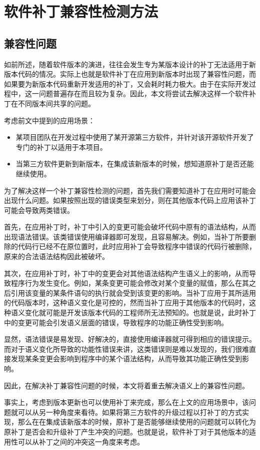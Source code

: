 \chapter{软件补丁兼容性检测方法}
\section{兼容性问题}
\label {sec_problem}
如前所述，随着软件版本的演进，往往会发生专为某版本设计的补丁无法适用于新版本代码的情况。实际上也就是软件补丁在应用到新版本时出现了兼容性问题，而如果要为新版本代码重新开发适用的补丁，又会耗时耗力极大。由于在实际开发过程中，这一问题普遍存在而且较为复杂。因此，本文将尝试去解决这样一个软件补丁在不同版本间共享的问题。

考虑前文中提到的应用场景：
\begin{itemize}
	\item 某项目团队在开发过程中使用了某开源第三方软件，并针对该开源软件开发了专门的补丁以适用于本项目。
	\item 当第三方软件更新到新版本，在集成该新版本的时候，想知道原补丁是否还能继续使用。
\end{itemize}

为了解决这样一个补丁兼容性检测的问题，首先我们需要知道补丁在应用时可能会出现什么问题。如果按照出现的错误类型来划分，则在其他版本代码上应用该补丁可能会导致两类错误。

首先，在应用补丁时，补丁中引入的变更可能会破坏代码中原有的语法结构，从而出现语法错误。该类错误使用编译器即可发现，且容易解决。例如，当补丁所要删除的代码行已经不在原位置时，此时应用补丁会导致程序中错误的代码行被删除，原来的合法语法结构因此被破坏。

其次，在应用补丁时，补丁中的变更会对其他语法结构产生语义上的影响，从而导致程序行为发生变化。例如，某条变更可能会修改对某个变量的赋值，那么在其之后引用该变量的某条件语句的执行就会受到该变更的影响。当补丁应用于其所适用的代码版本时，这种语义变化是可控的，然而当补丁应用于其他版本的代码时，这种语义变化就可能是开发该版本代码的工程师所无法预知的。也就是说，此时补丁中的变更可能会引发语义层面的错误，导致程序的功能正确性受到影响。

显然，语法错误是易发现、好解决的，直接使用编译器就可得到相应的错误提示。而对于语义变化所导致的功能性错误来讲，这类错误则是难以发现的，我们很难直接发现某条变更会影响到程序中的某个语法结构，从而导致其功能正确性受到影响。

因此，在解决补丁兼容性问题的时候，本文将着重去解决语义上的兼容性问题。

事实上，考虑到版本更新也可以使用补丁来完成，那么在上文的应用场景中，该问题就可以从另一种角度来看待。如果将第三方软件的升级过程以打补丁的方式实现，那么在在集成该新版本的时候，原补丁是否能够继续使用的问题就可以转化为原补丁是否会和升级补丁产生冲突的问题。也就是说，软件补丁对于其他版本的适用性可以从补丁之间的冲突这一角度来考虑。


